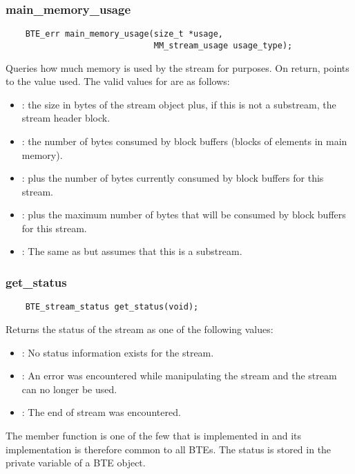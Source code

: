 \subsubsection{main\_memory\_usage}
\begin{verbatim}
    BTE_err main_memory_usage(size_t *usage,
                              MM_stream_usage usage_type);
\end{verbatim}
Queries how much memory is used by the stream for
 purposes. On return, 
points to the value used. The valid values for 
are as follows:
\begin{itemize}
\item {}: the size in
bytes of the stream object plus, if this is not a substream,
the stream header block.
\item {}: the number of
bytes consumed by block buffers (blocks of elements in main memory).
\item {}:
 plus the number of
bytes currently consumed by block buffers for this stream. 
\item {}:
 plus the maximum number of
bytes that will be consumed by block buffers for this
stream.
\item {}:
The same as  but assumes
that this is a substream.
\end{itemize}

\subsubsection{get\_status}
\begin{verbatim}
    BTE_stream_status get_status(void);
\end{verbatim}
Returns the status of the stream as one
of the following values:
\begin{itemize}
\item {}: No status
information exists for the stream.  
\item {}: An error was
encountered while manipulating the stream and the stream
can no longer be used.
\item {}: The end
of stream was encountered.
\end{itemize}
The  member function is one of the few
that is implemented in  and its
implementation is therefore common to all BTEs. The status
is stored in the private variable  of a BTE object. 

